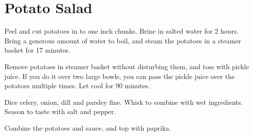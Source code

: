 \section{Potato Salad}
\begin{recipe}



Peel and cut potatoes in to one inch chunks.
Brine in salted water for 2 hours. 
Bring a generous amount of water to boil, and steam the potatoes in a steamer basket for 17 minutes.


Remove potatoes in steamer basket without disturbing them, and toss with pickle juice. 
If you do it over two large bowls, you can pass the pickle juice over the potatoes multiple times. 
Let cool for 90 minutes.


Dice celery, onion, dill and parsley fine. Whisk to combine with wet ingredients.
Season to taste with salt and pepper.


Combine the potatoes and sauce, and top with paprika.

\end{recipe}
